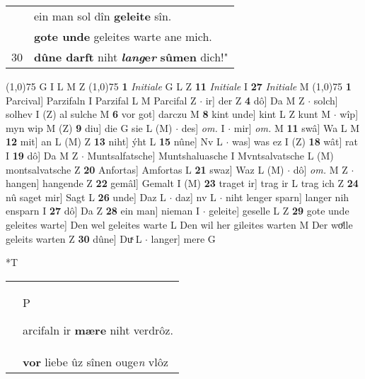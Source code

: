 \documentclass[8pt,a4paper,notitlepage]{article}
\begin{document}
\begin{table}[ht]
\begin{minipage}[t]{0.5\linewidth}
\begin{tabular}{rl}
 & ein man sol dîn \textbf{geleite} sîn.\\ 
 & \textbf{gote unde} geleites warte ane mich.\\ 
30 & \textbf{dûne darft} niht \textbf{\textit{lang}e\textit{r}} \textbf{sûmen} dich!"\\ 
\end{tabular}
\scriptsize
\line(1,0){75} \newline
G I L M Z \newline
\line(1,0){75} \newline
\textbf{1} \textit{Initiale} G L Z  \textbf{11} \textit{Initiale} I  \textbf{27} \textit{Initiale} M  \newline
\line(1,0){75} \newline
\textbf{1} Parcival] Parzifaln I Parzifal L M Parcifal Z  $\cdot$ ir] der Z \textbf{4} dô] Da M Z  $\cdot$ solch] solhev I (Z) al sulche M \textbf{6} vor got] darczu M \textbf{8} kint unde] kint L Z kunt M  $\cdot$ wîp] myn wip M (Z) \textbf{9} diu] die G sie L (M)  $\cdot$ des] \textit{om.} I  $\cdot$ mir] \textit{om.} M \textbf{11} swâ] Wa L M \textbf{12} mit] an L (M) Z \textbf{13} niht] ýht L \textbf{15} nûne] Nv L  $\cdot$ was] was ez I (Z) \textbf{18} wât] rat I \textbf{19} dô] Da M Z  $\cdot$ Muntsalfatsche] Muntshaluasche I Mvntsalvatsche L (M) montsalvatsche Z \textbf{20} Anfortas] Amfortas L \textbf{21} swaz] Waz L (M)  $\cdot$ dô] \textit{om.} M Z  $\cdot$ hangen] hangende Z \textbf{22} gemâl] Gemalt I (M) \textbf{23} traget ir] trag ir L trag ich Z \textbf{24} nû saget mir] Sagt L \textbf{26} unde] Daz L  $\cdot$ daz] nv L  $\cdot$ niht lenger sparn] langer nih ensparn I \textbf{27} dô] Da Z \textbf{28} ein man] nieman I  $\cdot$ geleite] geselle L Z \textbf{29} gote unde geleites warte] Den wel geleites warte L Den wil her gileites warten M Der woͤlle geleits warten Z \textbf{30} dûne] Duͯ L  $\cdot$ langer] mere G \newline
\end{minipage}
\hspace{0.5cm}
\begin{minipage}[t]{0.5\linewidth}
\small
\begin{center}*T
\end{center}
\begin{tabular}{rl}
 & \begin{Large}P\end{Large}arcifaln ir \textbf{mære} niht verdrôz.\\ 
 & \textbf{vor} liebe ûz sînen ouge\textit{n} vlôz\\ 

\end{tabular}
\end{minipage}
\end{table}
\end{document}
